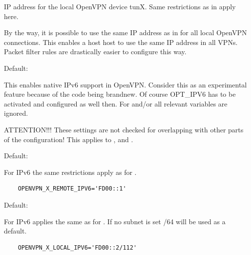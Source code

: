 \begin{description}
  IP address for the local OpenVPN device tunX. Same restrictions as in 
  apply here.

  By the way, it is possible to use the same IP address as in  
  for all local OpenVPN connections. This enables a host host to use the same IP address 
  in all VPNs. Packet filter rules are drastically easier to configure this way.
  

  Default: 
  
  This enables native IPv6 support in OpenVPN. Consider this as an experimental feature because 
  of the code being brandnew. Of course OPT\_IPV6 has to be activated and configured as well then. 
  For  and/or  all relevant variables are ignored. 
  
  ATTENTION!!! These settings are not checked for overlapping with other parts of the 
  configuration! This applies to ,
   and .
  

  Default: 
  
  For IPv6 the same restrictions apply as for .
  
  \begin{example}
  \begin{verbatim}
    OPENVPN_X_REMOTE_IPV6='FD00::1'
  \end{verbatim}
  \end{example}


  Default: 
  
  For IPv6 applies the same as for .
  If no subnet is set /64 will be used as a default.
  
  \begin{example}
  \begin{verbatim}
    OPENVPN_X_LOCAL_IPV6='FD00::2/112'
  \end{verbatim}
  \end{example}


\end{description}
